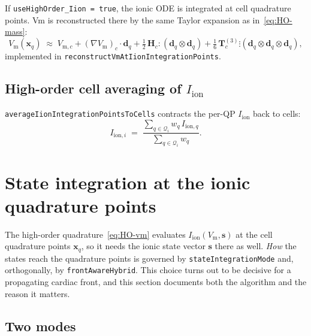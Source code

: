 \documentclass[11pt,a4paper]{article}
\newcommand{\code}[1]{\texttt{\small #1}}
\newcommand{\Vm}{V_{\text{m}}}
\newcommand{\Iion}{I_{\mathrm{ion}}}
\newcommand{\grad}{\nabla}
\newcommand{\Vmsub}[1]{V_{\text{m},#1}}
\newcommand{\Iionsub}[1]{I_{\mathrm{ion},#1}}
\newcommand{\dictkey}[1]{\textcolor{black!60!green}{\texttt{\footnotesize #1}}}
\begin{document}
If \code{useHighOrder\_Iion = true}, the ionic ODE is integrated at
cell quadrature points. Vm is reconstructed there by the same Taylor
expansion as in~\eqref{eq:HO-mass}:
\begin{equation}
  \Vm(\mathbf{x}_{q})
   \;\approx\;
   \Vmsub{c} + (\grad \Vm)_{c} \cdot \mathbf{d}_{q}
   + \tfrac{1}{2}\, \mathbf{H}_{c} \!:\! (\mathbf{d}_{q} \otimes \mathbf{d}_{q})
   + \tfrac{1}{6}\, \mathbf{T}^{(3)}_{c} \!\vdots\!
       (\mathbf{d}_{q} \otimes \mathbf{d}_{q} \otimes \mathbf{d}_{q}),
   \label{eq:HO-vm}
\end{equation}
implemented in \code{reconstructVmAtIionIntegrationPoints}.

\subsection{High-order cell averaging of $\Iion$}

\code{averageIionIntegrationPointsToCells} contracts the per-QP $\Iion$
back to cells:
\begin{equation}
  \Iionsub{i} \;=\;
   \frac{\sum_{q \in \mathcal{Q}_{i}} w_{q}\, \Iionsub{q}}
        {\sum_{q \in \mathcal{Q}_{i}} w_{q}}.
\end{equation}

\section{State integration at the ionic quadrature points}
\label{sec:stateint}

The high-order quadrature~\eqref{eq:HO-vm} evaluates $\Iion(\Vm,\mathbf{s})$
at the cell quadrature points $\mathbf{x}_q$, so it needs the ionic state
vector $\mathbf{s}$ there as well. \emph{How} the states reach the quadrature
points is governed by \dictkey{stateIntegrationMode} and, orthogonally, by
\dictkey{frontAwareHybrid}. This choice turns out to be decisive for a
propagating cardiac front, and this section documents both the algorithm and
the reason it matters.

\subsection{Two modes}
\end{document}
